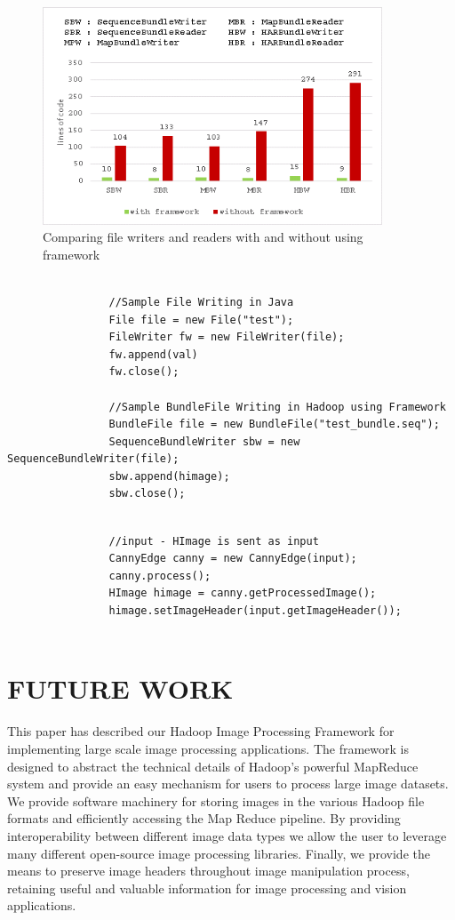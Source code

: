 \documentclass{osuthesis}
\begin{document}
				\begin{figure}[h]
					\centering
					\includegraphics[width=0.90\textwidth]{files-chart2}
					\caption{Comparing file writers and readers with and without using
						framework}
					\label{fig:files-chart}
				\end{figure}
				\newpage
				\begin{lstlisting}[caption = Comparing FileWriter instance in java and SequenceBundleWriter instance in Hadoop Image Processing framework ]
				
				//Sample File Writing in Java
				File file = new File("test");
				FileWriter fw = new FileWriter(file);
				fw.append(val)
				fw.close();
				
				//Sample BundleFile Writing in Hadoop using Framework
				BundleFile file = new BundleFile("test_bundle.seq");
				SequenceBundleWriter sbw = new SequenceBundleWriter(file);
				sbw.append(himage);
				sbw.close();
				\end{lstlisting}
				
				\begin{lstlisting}[caption = Setting image headers for processed images using Hadoop Image Processing Framework]
				
				//input - HImage is sent as input 
				CannyEdge canny = new CannyEdge(input);
				canny.process();
				HImage himage = canny.getProcessedImage();
				himage.setImageHeader(input.getImageHeader());
				
				\end{lstlisting}
				
				\chapter{FUTURE WORK}
				This paper has described our Hadoop Image Processing Framework for
				implementing large scale image processing applications.  The framework
				is designed to abstract the technical details of Hadoop's powerful
				MapReduce system and provide an easy mechanism for users to process
				large image datasets. We provide software machinery for storing images
				in the various Hadoop file formats and efficiently accessing the Map
				Reduce pipeline.  By providing interoperability between different
				image data types we allow the user to leverage many different
				open-source image processing libraries. Finally, we provide the means
				to preserve image headers throughout image manipulation process,
				retaining useful and valuable information for image processing and
				vision applications.
				
\end{document}

